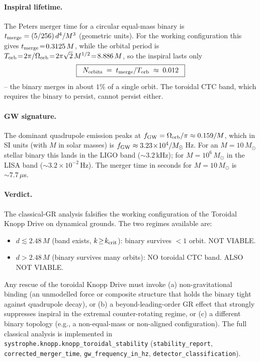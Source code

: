 \documentclass[11pt,a4paper]{article}
\begin{document}
\paragraph{Inspiral lifetime.} The Peters merger time for a circular equal-mass binary is $t_{\rm merge}=(5/256)\,d^{4}/M^{3}$ (geometric units). For the working configuration this gives $t_{\rm merge}\!=\!0.3125\,M$, while the orbital period is $T_{\rm orb}\!=\!2\pi/\Omega_{\rm orb}\!=\!2\pi\sqrt{2}\,M^{1/2}\!=\!8.886\,M$, so the inspiral lasts only
\begin{equation}\boxed{\;\;N_{\rm orbits}\;=\;t_{\rm merge}/T_{\rm orb}\;\approx\;0.012\;\;}\end{equation}
-- the binary merges in about $1\%$ of a single orbit. The toroidal CTC band, which requires the binary to persist, cannot persist either.

\paragraph{GW signature.} The dominant quadrupole emission peaks at $f_{\rm GW}=\Omega_{\rm orb}/\pi\approx 0.159/M$, which in SI units (with $M$ in solar masses) is $f_{\rm GW}\approx 3.23\!\times\!10^{4}/M_{\odot}\,$Hz. For an $M\!=\!10\,M_{\odot}$ stellar binary this lands in the LIGO band ($\sim\!3.2\,$kHz); for $M\!=\!10^{6}\,M_{\odot}$ in the LISA band ($\sim\!3.2\!\times\!10^{-2}\,$Hz). The merger time in seconds for $M\!=\!10\,M_{\odot}$ is $\sim\!7.7\,\mu$s.

\paragraph{Verdict.} The classical-GR analysis falsifies the working configuration of the Toroidal Knopp Drive on dynamical grounds. The two regimes available are:
\begin{itemize}[leftmargin=*]
\item $d\!\lesssim\!2.48\,M$ (band exists, $k\!\geq\!k_{\rm crit}$): binary survives $<\!1$ orbit. NOT VIABLE.
\item $d\!>\!2.48\,M$ (binary survives many orbits): NO toroidal CTC band. ALSO NOT VIABLE.
\end{itemize}
Any rescue of the toroidal Knopp Drive must invoke (a) non-gravitational binding (an unmodelled force or composite structure that holds the binary tight against quadrupole decay), or (b) a beyond-leading-order GR effect that strongly suppresses inspiral in the extremal counter-rotating regime, or (c) a different binary topology (e.g., a non-equal-mass or non-aligned configuration). The full classical analysis is implemented in \texttt{systrophe.knopp.knopp\_toroidal\_stability} (\texttt{stability\_report}, \texttt{corrected\_merger\_time}, \texttt{gw\_frequency\_in\_hz}, \texttt{detector\_classification}).
\end{document}
